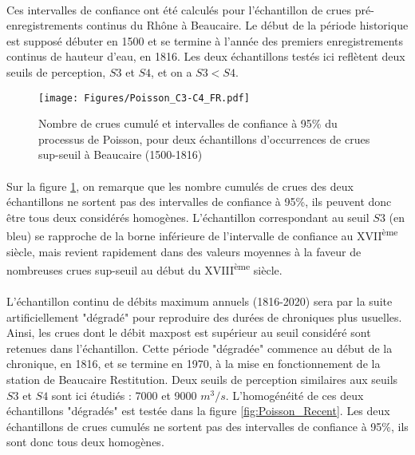 \documentclass[11pt]{article}
\begin{document}
	\paragraph{} Ces intervalles de confiance ont été calculés pour l'échantillon de crues pré-enregistrements continus du Rhône à Beaucaire. Le début de la période historique est supposé débuter en 1500 et se termine à l'année des premiers enregistrements continus de hauteur d'eau, en 1816. Les deux échantillons testés ici reflètent deux seuils de perception, $S3$ et $S4$, et on a $S3 < S4$. 

	\begin{figure}[h]
		\centering
		\texttt{[image: Figures/Poisson\_C3-C4\_FR.pdf]}	
		\caption{Nombre de crues cumulé et intervalles de confiance à 95\% du processus de 						Poisson, pour deux échantillons d'occurrences de crues sup-seuil à Beaucaire 							(1500-1816)}
		\label{fig:Poisson_C3-C4}
	\end{figure}		
	
	\paragraph{} Sur la figure \ref{fig:Poisson_C3-C4}, on remarque que les nombre cumulés de crues des deux échantillons ne sortent pas des intervalles de confiance à 95\%, ils peuvent donc être tous deux considérés homogènes. L'échantillon correspondant au seuil $S3$ (en bleu) se rapproche de la borne inférieure de l'intervalle de confiance au XVII\textsuperscript{ème} siècle, mais revient rapidement dans des valeurs moyennes à la faveur de nombreuses crues sup-seuil au début du XVIII\textsuperscript{ème} siècle. 
	
	\paragraph{} L'échantillon continu de débits maximum annuels (1816-2020) sera par la suite artificiellement "dégradé" pour reproduire des durées de chroniques plus usuelles. Ainsi, les crues dont le débit maxpost est supérieur au seuil considéré sont retenues dans l'échantillon. Cette période "dégradée" commence au début de la chronique, en 1816, et se termine en 1970, à la mise en fonctionnement de la station de Beaucaire Restitution. Deux seuils de perception similaires aux seuils $S3$ et $S4$ sont ici étudiés : 7000 et 9000 $m^3/s$. L'homogénéité de ces deux échantillons "dégradés" est testée dans la figure \ref{fig:Poisson_Recent}. Les deux échantillons de crues cumulés ne sortent pas des intervalles de confiance à 95\%, ils sont donc tous deux homogènes. 
	
\end{document}
